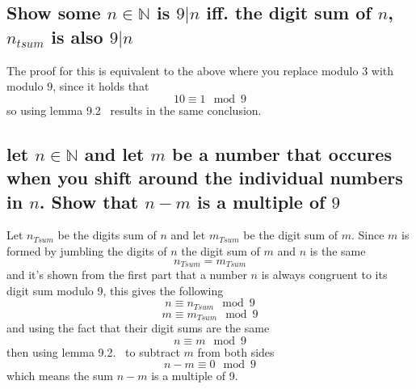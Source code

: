 \documentclass[12pt]{article}
\begin{document}
\subsection*{Show some $n \in \mathbb{N}$ is $9|n$ iff. the digit sum of $n$, $n_{tsum}$ is also $9|n$}
The proof for this is equivalent to the above where you replace modulo 3 with modulo 9, since it holds that
\[
10 \equiv 1 \mod 9
\]
so using lemma 9.2~\cite{Algebra} results in the same conclusion.
\subsection*{let $n \in \mathbb{N}$ and let $m$ be a number that occures when you shift around the individual numbers in $n$. Show that $n-m$ is a multiple of $9$}
Let $n_{Tsum}$ be the digits sum of $n$ and let $m_{Tsum}$ be the digit sum of $m$. Since $m$ is formed by jumbling the digits of $n$ the digit sum of $m$ and $n$ is the same
\[
n_{Tsum} = m_{Tsum}
\]
and it's shown from the first part that a number $n$ is always congruent to its digit sum  modulo 9, this gives the following
\[
n \equiv n_{Tsum} \mod 9
\]
\[
m \equiv m_{Tsum} \mod 9
\]
and using the fact that their digit sums are the same
\[
n \equiv m \mod 9
\]
then using lemma 9.2.~\cite{Algebra} to subtract $m$ from both sides
\[
n-m \equiv 0 \mod 9
\]
which means the sum $n-m$ is a multiple of 9.
\printbibliography
\end{document}
